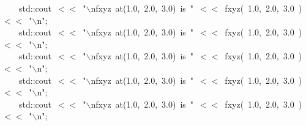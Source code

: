 \documentclass[9pt,onside,a4paper]{article}
\newcommand{\hlstd}[1]{\textcolor[rgb]{0.2,0,0.4}{#1}}
\newcommand{\hlnum}[1]{\textcolor[rgb]{0.2,0.73,0.02}{#1}}
\newcommand{\hlesc}[1]{\textcolor[rgb]{0.65,0.09,0.38}{#1}}
\newcommand{\hlstr}[1]{\textcolor[rgb]{0.09,0.38,0.65}{#1}}
\newcommand{\hlopt}[1]{\textcolor[rgb]{0.33,0.33,0.33}{#1}}
\newcommand{\hlkwd}[1]{\textcolor[rgb]{0.82,0.11,0.93}{#1}}
\begin{document}
{{}\hlstd{\ \ \ \ }\hlstd{std}\hlopt{::}\hlstd{cout\ }\hlopt{$<$$<$\ }\hlstd{}\hlstr{"}\hlesc{$\backslash$n}\hlstr{fxyz\ at(1.0,\ 2.0,\ 3.0)\ is\ "}\hlstd{\ }\hlopt{$<$$<$\ }\hlstd{}\hlkwd{fxyz}\hlstd{}\hlopt{(\ }\hlstd{}\hlnum{1.0}\hlstd{}\hlopt{,\ }\hlstd{}\hlnum{2.0}\hlstd{}\hlopt{,\ }\hlstd{}\hlnum{3.0\ }\hlstd{}\hlopt{)\ $<$$<$\ }\hlstd{}\hlstr{"}\hlesc{$\backslash$n}\hlstr{"}\hlstd{}\hlopt{;}\hspace*{\fill}\\
\hlstd{}\hlstd{\ \ \ \ }\hlstd{std}\hlopt{::}\hlstd{cout\ }\hlopt{$<$$<$\ }\hlstd{}\hlstr{"}\hlesc{$\backslash$n}\hlstr{fxyz\ at(1.0,\ 2.0,\ 3.0)\ is\ "}\hlstd{\ }\hlopt{$<$$<$\ }\hlstd{}\hlkwd{fxyz}\hlstd{}\hlopt{(\ }\hlstd{}\hlnum{1.0}\hlstd{}\hlopt{,\ }\hlstd{}\hlnum{2.0}\hlstd{}\hlopt{,\ }\hlstd{}\hlnum{3.0\ }\hlstd{}\hlopt{)\ $<$$<$\ }\hlstd{}\hlstr{"}\hlesc{$\backslash$n}\hlstr{"}\hlstd{}\hlopt{;}\hspace*{\fill}\\
\hlstd{}\hlstd{\ \ \ \ }\hlstd{std}\hlopt{::}\hlstd{cout\ }\hlopt{$<$$<$\ }\hlstd{}\hlstr{"}\hlesc{$\backslash$n}\hlstr{fxyz\ at(1.0,\ 2.0,\ 3.0)\ is\ "}\hlstd{\ }\hlopt{$<$$<$\ }\hlstd{}\hlkwd{fxyz}\hlstd{}\hlopt{(\ }\hlstd{}\hlnum{1.0}\hlstd{}\hlopt{,\ }\hlstd{}\hlnum{2.0}\hlstd{}\hlopt{,\ }\hlstd{}\hlnum{3.0\ }\hlstd{}\hlopt{)\ $<$$<$\ }\hlstd{}\hlstr{"}\hlesc{$\backslash$n}\hlstr{"}\hlstd{}\hlopt{;}\hspace*{\fill}\\
\hlstd{}\hlstd{\ \ \ \ }\hlstd{std}\hlopt{::}\hlstd{cout\ }\hlopt{$<$$<$\ }\hlstd{}\hlstr{"}\hlesc{$\backslash$n}\hlstr{fxyz\ at(1.0,\ 2.0,\ 3.0)\ is\ "}\hlstd{\ }\hlopt{$<$$<$\ }\hlstd{}\hlkwd{fxyz}\hlstd{}\hlopt{(\ }\hlstd{}\hlnum{1.0}\hlstd{}\hlopt{,\ }\hlstd{}\hlnum{2.0}\hlstd{}\hlopt{,\ }\hlstd{}\hlnum{3.0\ }\hlstd{}\hlopt{)\ $<$$<$\ }\hlstd{}\hlstr{"}\hlesc{$\backslash$n}\hlstr{"}\hlstd{}\hlopt{;}\hspace*{\fill}\\
\hlstd{}\hlstd{\ \ \ \ }\hlstd{std}\hlopt{::}\hlstd{cout\ }\hlopt{$<$$<$\ }\hlstd{}\hlstr{"}\hlesc{$\backslash$n}\hlstr{fxyz\ at(1.0,\ 2.0,\ 3.0)\ is\ "}\hlstd{\ }\hlopt{$<$$<$\ }\hlstd{}\hlkwd{fxyz}\hlstd{}\hlopt{(\ }\hlstd{}\hlnum{1.0}\hlstd{}\hlopt{,\ }\hlstd{}\hlnum{2.0}\hlstd{}\hlopt{,\ }\hlstd{}\hlnum{3.0\ }\hlstd{}\hlopt{)\ $<$$<$\ }\hlstd{}\hlstr{"}\hlesc{$\backslash$n}\hlstr{"}\hlstd{}\hlopt{;}\hspace*{\fill}\\
}
\end{document}
